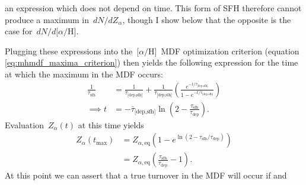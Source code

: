\documentclass[12pt]{article}
\newcommand{\ah}{\ensuremath{\text{[$\alpha$/H]}}}
\newcommand{\timescale}[1]{\ensuremath{\tau_\text{#1}}}
\newcommand{\harmonic}[2]{\ensuremath{\bar{\tau}_\text{[#1,#2]}}}
\begin{document}
an expression which does not depend on time.
This form of SFH therefore cannot produce a maximum in~$dN / dZ_\alpha$, though
I show below that the opposite is the case for~$dN / d\ah$.
\par
Plugging these expressions into the~\ah~MDF optimization criterion (equation
\ref{eq:mhmdf_maxima_criterion}) then yields the following expression for the
time at which the maximum in the MDF occurs:
\begin{subequations}\begin{align}
\frac{1}{\timescale{sfh}} &= \frac{1}{\harmonic{dep}{sfh}} +
\frac{1}{\harmonic{dep}{sfh}} \left(\frac{
	e^{-t / \harmonic{dep}{sfh}}
}{
	1 - e^{-t / \harmonic{dep}{sfh}}
}\right)
\\
\implies t &= -\harmonic{dep}{sfh} \ln \left( 2 -
\frac{\timescale{sfh}}{\timescale{dep}}\right).
\end{align}\end{subequations}
Evaluation~$Z_\alpha(t)$ at this time yields
\begin{subequations}\begin{align}
Z_\alpha(t_\text{max}) &= Z_{\alpha,\text{eq}} \left(
1 - e^{\ln \left(2 - \timescale{sfh} / \timescale{dep}\right)}
\right)
\\
&= Z_{\alpha,\text{eq}} \left(\frac{\timescale{sfh}}{\timescale{dep}} -
1\right).
\end{align}\end{subequations}
At this point we can assert that a true turnover in the MDF will occur if and
\end{document}
